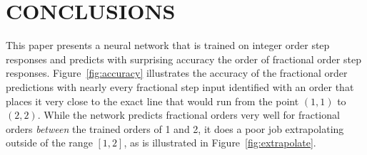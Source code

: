 \section{CONCLUSIONS}
\label{sec:conclusions}

This paper presents a neural network that is trained on integer order step
responses and predicts with surprising accuracy the order of fractional order
step responses. Figure~\ref{fig:accuracy} illustrates the accuracy of the
fractional order predictions with nearly every fractional step input identified
with an order that places it very close to the exact line that would run from
the point $(1,1)$ to $(2,2)$. While the network predicts fractional orders
very well for fractional orders \emph{between} the trained orders of 1 and 2, it
does a poor job extrapolating outside of the range $[1,2]$, as is illustrated in
Figure~\ref{fig:extrapolate}. 
